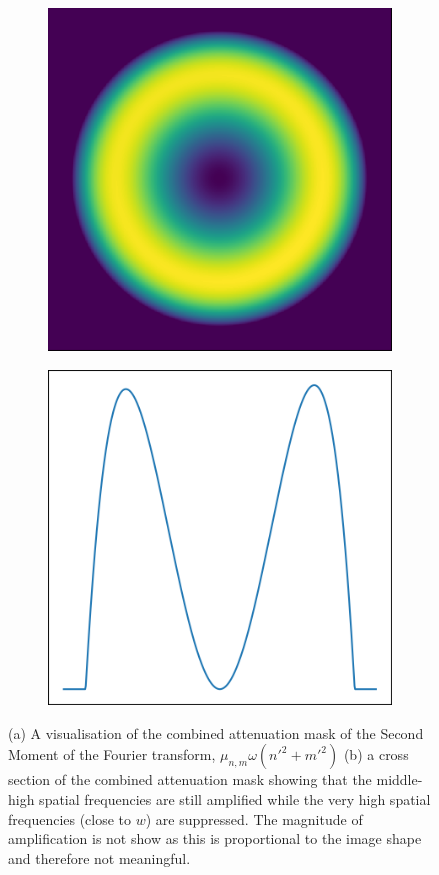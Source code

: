 \begin{figure}[h]
	\begin{subfigure}{0.4\textwidth}
		\includegraphics[scale=1]{./images/second_moment_combine_mask.png}
		\caption{}
		\label{fig:second_moment_combine_mask}
	\end{subfigure}
	\begin{subfigure}{0.41\textwidth}
		\includegraphics[scale=1]{./images/second_moment_combine_mask_cross_section.png}
		\caption{}
		\label{fig:second_moment_combine_mask_cross_section}
	\end{subfigure}
	\caption{(a) A visualisation of the combined attenuation mask of the Second Moment of the Fourier transform, $\mu_{n,m}\omega(n'^{2} + m'^{2})$ (b) a cross section of the combined attenuation mask showing that the middle-high spatial frequencies are still amplified while the very high spatial frequencies (close to $w$) are suppressed. The magnitude of amplification is not show as this is proportional to the image shape and therefore not meaningful.}
	\label{fig:second_moment_combine_mask_w_cross_section}
\end{figure}


